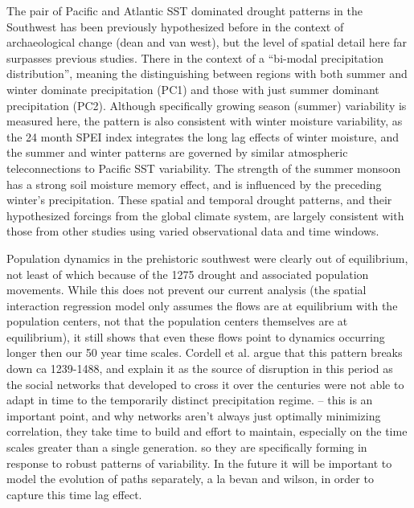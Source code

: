 \documentclass[10pt]{iopart}
\begin{document}
The pair of Pacific and Atlantic SST dominated drought patterns in the Southwest has been previously hypothesized before in the context of archaeological change (dean and van west), but the level of spatial detail here far surpasses previous studies. There in the context of a ``bi-modal precipitation distribution'', meaning the distinguishing between regions with both summer and winter dominate precipitation (PC1) and those with just summer dominant precipitation (PC2). Although specifically growing season (summer) variability is measured here, the pattern is also consistent with winter moisture variability, as the 24 month SPEI index integrates the long lag effects of winter moisture, and the summer and winter patterns are governed by similar atmospheric teleconnections to Pacific SST variability. The strength of the summer monsoon has a strong soil moisture memory effect, and is influenced by the preceding winter's precipitation. These spatial and temporal drought patterns, and their hypothesized forcings from the global climate system, are largely consistent with those from other studies using varied observational data and time windows\parencite{Comrie1999,Cook1999,McCabe1999,McCabe2004,Herrmann2016DivergentElevations,Ryu2010,Seager2014}. 

Population dynamics in the prehistoric southwest were clearly out of equilibrium, not least of which because of the 1275 drought and associated population movements. While this does not prevent our current analysis (the spatial interaction regression model only assumes the flows are at equilibrium with the population centers, not that the population centers themselves are at equilibrium), it still shows that even these flows point to dynamics occurring longer then our 50 year time scales. Cordell et al. argue that this pattern breaks down ca 1239-1488, and explain it as the source of disruption in this period as the social networks that developed to cross it over the centuries were not able to adapt in time to the temporarily distinct precipitation regime. -- this is an important point, and why networks aren't always just optimally minimizing correlation, they take time to build and effort to maintain, especially on the time scales greater than a single generation. so they are specifically forming in response to robust patterns of variability. In the future it will be important to model the evolution of paths separately, a la bevan and wilson, in order to capture this time lag effect.
\end{document}
